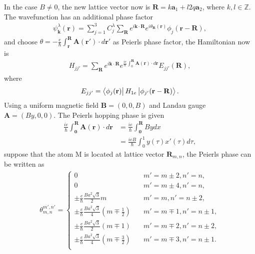 \documentclass{article}
\begin{document}
In the case $B \neq 0$, the new lattice vector now is $\mathbf{R} = k \mathbf{a}_{1} + l 2q \mathbf{a}_{2}$, where $k,l \in \mathbb{Z}$. The wavefunction has an additional phase factor
\begin{gather}
	\psi_{\mathbf{k}}^{\lambda} (\mathbf{r}) = \sum_{j=1}^{3} C_{j}^{\lambda} \sum_{\mathbf{R}} e^{i \mathbf{k} \cdot \mathbf{R}} e^{i \theta_{\mathbf{R}} (\mathbf{r})} \phi_{j} (\mathbf{r} - \mathbf{R}),
\end{gather}
and choose $\theta = -\frac{e}{\hbar}\int_{\mathbf{r}}^{\mathbf{R}} \mathbf{A}(\mathbf{r}') \cdot d \mathbf{r}'$ as Peierls phase factor, the Hamiltonian now is
\begin{gather}
	H_{j  j' }^{} = \sum_{\mathbf{R}} e^{i \mathbf{k} \cdot \mathbf{R}} e^{\frac{ie}{\hbar} \int_{0}^{\mathbf{R}} \mathbf{A}(\mathbf{r}) \cdot d \mathbf{r}} E_{jj'} (\mathbf{R}),
\end{gather}
where
\begin{gather}
	E_{jj'} = \bra{\phi_{j}(\mathbf{r})} H_{1e} \ket{\phi_{j'} (\mathbf{r} - \mathbf{R})}.
\end{gather}
Using a uniform magnetic field $\mathbf{B} = (0,0,B)$ and Landau gauge $\mathbf{A} = (By,0,0)$. The Peierls hopping phase is given
\begin{equation}
	\begin{aligned}
		\frac{ie}{\hbar} \int_{\mathbf{0}}^{\mathbf{R}} \mathbf{A}(\mathbf{r}) \cdot d \mathbf{r} & = \frac{ie}{\hbar} \int_{\mathbf{0}}^{\mathbf{R}} B y dx \\
		                                                                                          & = \frac{ieB}{\hbar} \int_{0}^{1} y(\tau) x'(\tau) d\tau,
	\end{aligned}
\end{equation}
suppose that the atom M is located at lattice vector $\mathbf{R}_{m,n}$, the Peierls phase can be written as
\begin{gather}
	\theta_{m,n}^{m',n'} =
	\begin{cases}
		0                                                                             & \quad m' = m \pm 2, n' = n  ,      \\
		0                                                                             & \quad m' = m \pm 4, n' = n  ,      \\
		\pm \frac{e}{\hbar} \frac{B a^{2} \sqrt{3}}{2} m                              & \quad m' = m , n' = n \pm 2,       \\
		\pm \frac{e}{\hbar} \frac{B a^{2} \sqrt{3}}{4} \left(m \mp \frac{1}{2}\right) & \quad m' = m \mp 1, n' = n \pm 1 , \\
		\pm \frac{e}{\hbar} \frac{B a^{2} \sqrt{3}}{2} (m \mp 1)                      & \quad m' = m \mp 2, n' = n \pm 2,  \\
		\pm \frac{e}{\hbar} \frac{B a^{2} \sqrt{3}}{4} \left(m \mp \frac{3}{2}\right) & \quad m' = m \mp 3, n' = n \pm 1.  \\
	\end{cases}
\end{gather}
\end{document}
